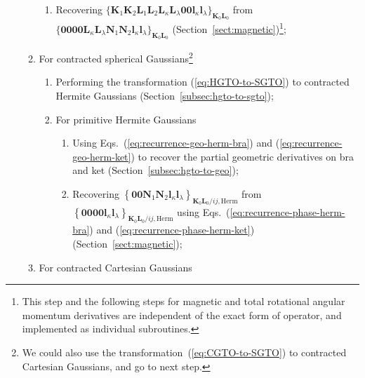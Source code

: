 \documentclass[a4paper,11pt,twoside,openright]{book}
\begin{document}
\begin{enumerate}
\begin{enumerate}
\begin{enumerate}
      \item Recovering $\{\boldsymbol{K}_{1}\boldsymbol{K}_{2}\boldsymbol{L}_{1}\boldsymbol{L}_{2}%
          \boldsymbol{L}_{\kappa}\boldsymbol{L}_{\lambda}\boldsymbol{00}\boldsymbol{l}_{\kappa}%
          \boldsymbol{l}_{\lambda}\}_{\boldsymbol{K}_{0}\boldsymbol{L}_{0}}$
          from $\{\boldsymbol{0000}\boldsymbol{L}_{\kappa}\boldsymbol{L}_{\lambda}\boldsymbol{N}_{1}%
        \boldsymbol{N}_{2}\boldsymbol{l}_{\kappa}\boldsymbol{l}_{\lambda}\}_{\boldsymbol{K}_{0}\boldsymbol{L}_{0}}$
          (Section~\ref{sect:magnetic})\footnote{This step and the following steps for magnetic and total rotational
          angular momentum derivatives are independent of the exact form of operator, and implemented as
          individual subroutines.};
    \end{enumerate}
    \item For contracted spherical Gaussians\footnote{We could also use the transformation~(\ref{eq:CGTO-to-SGTO})
      to contracted Cartesian Gaussians, and go to next step.}
    \begin{enumerate}
      \item Performing the transformation (\ref{eq:HGTO-to-SGTO}) to contracted Hermite Gaussians
        (Section~\ref{subsec:hgto-to-sgto});
      \item For primitive Hermite Gaussians
      \begin{enumerate}
        \item Using Eqs.~(\ref{eq:recurrence-geo-herm-bra}) and (\ref{eq:recurrence-geo-herm-ket}) to
          recover the partial geometric derivatives on bra and ket (Section~\ref{subsec:hgto-to-geo});
        \item Recovering $\left\{\boldsymbol{00}\boldsymbol{N}_{1}\boldsymbol{N}_{2}\boldsymbol{l}_{\kappa}%
          \boldsymbol{l}_{\lambda}\right\}_{\boldsymbol{K}_{0}\boldsymbol{L}_{0}/ij,\text{Herm}}$
          from $\left\{\boldsymbol{0000}\boldsymbol{l}_{\kappa}%
          \boldsymbol{l}_{\lambda}\right\}_{\boldsymbol{K}_{0}\boldsymbol{L}_{0}/ij,\text{Herm}}$
          using Eqs.~(\ref{eq:recurrence-phase-herm-bra}) and (\ref{eq:recurrence-phase-herm-ket})
          (Section~\ref{sect:magnetic});
      \end{enumerate}
    \end{enumerate}
    \item For contracted Cartesian Gaussians
\end{enumerate}
\end{enumerate}
\end{document}

